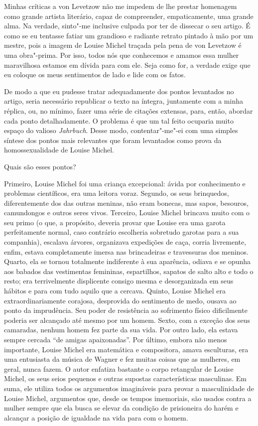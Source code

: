 Minhas críticas a von Levetzow não me impedem de lhe prestar homenagem
como grande artista literário, capaz de compreender, empaticamente, uma
grande alma. Na verdade, sinto"-me inclusive culpada por ter de dissecar
o seu artigo. É como se eu tentasse fatiar um grandioso e radiante
retrato pintado à mão por um mestre, pois a imagem de Louise Michel
traçada pela pena de von Levetzow é uma obra"-prima. Por isso, todos nós
que conhecemos e amamos essa mulher maravilhosa estamos em dívida para com
ele. Seja como for, a verdade exige que eu coloque os meus sentimentos
de lado e lide com os fatos.

De modo a que eu pudesse tratar adequadamente dos pontos levantados no
artigo, seria necessário republicar o texto na íntegra, juntamente com a
minha réplica, ou, no mínimo, fazer uma série de citações extensas,
para, então, abordar cada ponto detalhadamente. O problema é que um tal
feito ocuparia muito espaço do valioso \textit{Jahrbuch}. Desse modo,
contentar"-me"-ei com uma simples síntese dos pontos mais relevantes que
foram levantados como prova da homossexualidade de Louise Michel.

Quais são esses pontos?

Primeiro, Louise Michel foi uma criança excepcional: ávida por
conhecimento e problemas científicos, era uma leitora voraz. Segundo, os
seus brinquedos, diferentemente dos das outras meninas, não eram
bonecas, mas sapos, besouros, camundongos e outros seres vivos.
Terceiro, Louise Michel brincava muito com o seu primo (o que, a
propósito, deveria provar que Louise era uma garota perfeitamente
normal, caso contrário escolheria sobretudo garotas para a sua
companhia), escalava árvores, organizava expedições de caça, corria
livremente, enfim, estava completamente imersa nas brincadeiras e
travessuras dos meninos. Quarto, ela se tornou totalmente indiferente à
sua aparência, odiava e se opunha aos babados das vestimentas femininas,
espartilhos, sapatos de salto alto e todo o resto; era terrivelmente
displicente consigo mesma e desorganizada em seus hábitos e para com
tudo aquilo que a cercava. Quinto, Louise Michel era extraordinariamente
corajosa, desprovida do sentimento de medo, ousava ao ponto da
imprudência. Seu poder de resistência ao sofrimento físico dificilmente
poderia ser alcançado até mesmo por um homem. Sexto, com a exceção dos seus
camaradas, nenhum homem fez parte da sua vida. Por outro lado, ela
estava sempre cercada ``de amigas apaixonadas''. Por último, embora não
menos importante, Louise Michel era matemática e compositora, amava
esculturas, era uma entusiasta da música de Wagner e fez muitas coisas
que as mulheres, em geral, nunca fazem. O autor enfatiza bastante o
corpo retangular de Louise Michel, os seus seios pequenos e outras
supostas características masculinas. Em suma, ele utiliza todos os
argumentos imagináveis ​​para provar a masculinidade de Louise Michel,
argumentos que, desde os tempos imemoriais, são usados contra a mulher
sempre que ela busca se elevar da condição de prisioneira do harém e
alcançar a posição de igualdade na vida para com o homem.

